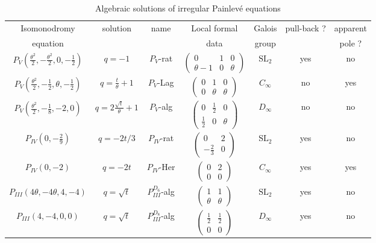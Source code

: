 \documentclass[12]{amsart}
\newcommand{\SL}{\mathrm{SL}_2}
\begin{document}
\begin{table}[h]
\caption{Algebraic solutions of irregular Painlev\'e equations}
\begin{center}
\begin{tabular}{|c|c|c|c|c|c|c|}
\hline 
 Isomonodromy  & solution & name & Local formal   & Galois & pull-back ? & apparent\\
 equation &  & & data & group & & pole ? \\
\hline
$P_{V}\left(\frac{\theta^2}{2},-\frac{\theta^2}{2},0,-\frac{1}{2}\right)$ & 
$q=-1$ & $P_V$-rat & $\begin{pmatrix}0&1&0\\ \theta-1&0&\theta\end{pmatrix}$ & $\SL$ & yes & no \\
\hline
$P_{V}\left(\frac{\theta^2}{2},-\frac{1}{2},\theta,-\frac{1}{2}\right)$ &
$q=\frac{t}{\theta}+1$ & $P_V$-Lag & $\begin{pmatrix}0&1&0\\ 0&\theta&\theta\end{pmatrix}$ & $C_\infty$ & no & yes\\
\hline
$P_{V}\left(\frac{\theta^2}{2},-\frac{1}{8},-2,0\right)$ &
$q=2\frac{\sqrt{t}}{\theta}+1$ & $P_V$-alg & $\begin{pmatrix}0&\frac{1}{2}&0\\ \frac{1}{2}&0&\theta\end{pmatrix}$ & $D_\infty$ & no & no\\
\hline
 $P_{IV}\left(0,-\frac{2}{9}\right)$ & $q=-2t/3$ & $P_{IV}$-rat & $\begin{pmatrix}0&2\\ -\frac{2}{3}&0\end{pmatrix}$ 
 & $\SL$ & yes & no \\
\hline
 $P_{IV}\left(0,-2\right)$ & $q=-2t$ & $P_{IV}$-Her & $\begin{pmatrix}0&2\\ 0&0\end{pmatrix}$ & $C_\infty$ & yes & yes \\
\hline
 $P_{III}\left(4\theta,-4\theta,4,-4\right)$ & $q=\sqrt{t}$ & $P_{III}^{D_6}$-alg & $\begin{pmatrix}1&1\\ \theta&\theta\end{pmatrix}$ & $\SL$ & yes & no \\
\hline
 $P_{III}\left(4,-4,0,0\right)$ & $q=\sqrt{t}$ & $P_{III}^{D_8}$-alg & $\begin{pmatrix}\frac{1}{2}&\frac{1}{2}\\ 0&0\end{pmatrix}$ & $D_\infty$ & yes & no \\

\end{tabular}
\end{center}
\end{table}
\end{document}
